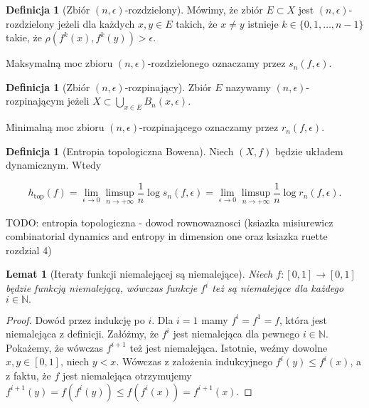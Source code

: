 \documentclass[licencjacka]{pwr_wmat_praca_dyplomowa}
\theoremstyle{plain}
\numberwithin{theorem}{chapter}
\newtheorem{lemma}[theorem]{Lemat}
\theoremstyle{definition}
\numberwithin{theorem}{chapter}
\newtheorem{definition}[theorem]{Definicja}
\begin{document}
\begin{definition}[Zbiór $(n,\epsilon)$-rozdzielony]
Mówimy, że zbiór $E \subset X$ jest $(n, \epsilon)$-rozdzielony jeżeli dla każdych $x, y \in E$ takich, że $x \neq y$ istnieje $k \in \{0, 1, \ldots, n-1\}$ takie, że $\rho(f^k(x), f^k(y)) > \epsilon.$

Maksymalną moc zbioru $(n, \epsilon)$-rozdzielonego oznaczamy przez $s_n(f, \epsilon).$
\end{definition}


\begin{definition}[Zbiór $(n, \epsilon)$-rozpinający]
Zbiór $E$ nazywamy $(n,\epsilon)$-rozpinającym jeżeli $X \subset \bigcup_{x \in E}B_n(x, \epsilon)$.

Minimalną moc zbioru $(n, \epsilon)$-rozpinającego oznaczamy przez $r_n(f, \epsilon).$

\end{definition}


\begin{definition}[Entropia topologiczna Bowena]
Niech $(X, f)$ będzie układem dynamicznym.
Wtedy

$$h_{\textrm{top}}(f) = \lim_{\epsilon \rightarrow 0} \limsup_{n \rightarrow +\infty} \frac{1}{n} \log s_n(f, \epsilon) = \lim_{\epsilon \rightarrow 0} \limsup_{n \rightarrow +\infty} \frac{1}{n} \log r_n(f, \epsilon).$$

\end{definition}



TODO: entropia topologiczna - dowod rownowaznosci
 (ksiazka misiurewicz combinatorial dynamics and entropy in dimension one oraz ksiazka ruette rozdzial 4)
 
 
\begin{lemma}[Iteraty funkcji niemalejącej są niemalejące]
\label{iteraty_niemalejacych_sa_niemalejace}
Niech $f: [0, 1] \rightarrow [0, 1]$ będzie funkcją niemalejącą, wówczas funkcje $f^{i}$ też są niemalejące dla każdego $i \in \mathbb{N}.$ 
\end{lemma}

\begin{proof}
Dowód przez indukcję po $i$. Dla $i=1$ mamy $f^i = f^1 = f$, która jest niemalejąca z definicji.
Załóżmy, że $f^i$ jest niemalejąca dla pewnego $i \in \mathbb{N}$. Pokażemy, że wówczas $f^{i+1}$ też jest niemalejąca. Istotnie, weźmy dowolne $x, y \in [0,1]$, niech $y < x$. Wówczas z założenia indukcyjnego $f^i(y) \leq f^i(x)$, a z faktu, że $f$ jest niemalejąca otrzymujemy $f^{i+1}(y)= f(f^i(y)) \leq f(f^i(x)) = f^{i+1}(x).$
\end{proof}
 
\end{document}
